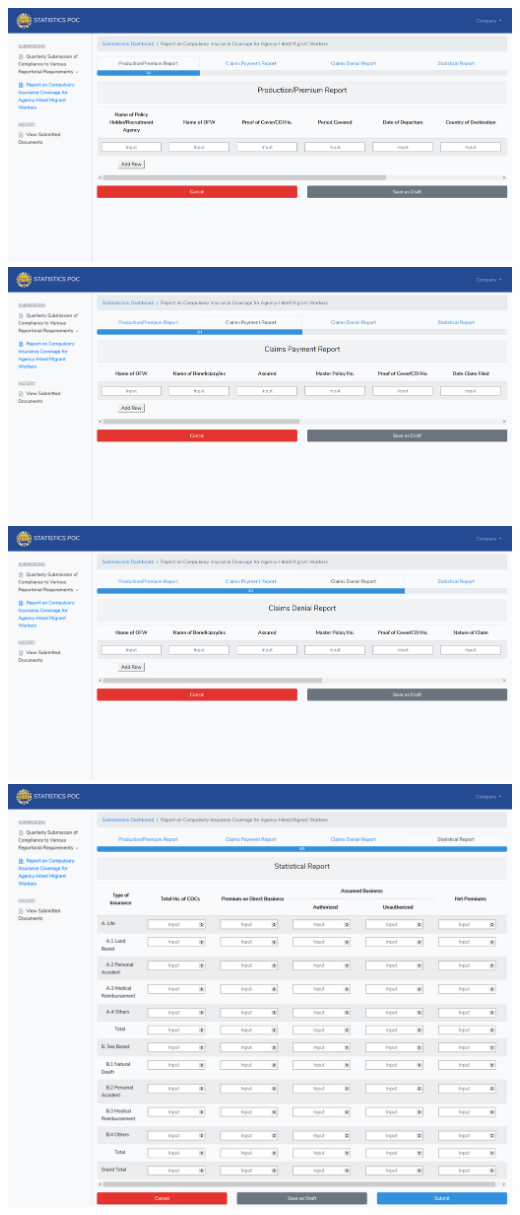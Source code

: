 \documentclass{article}
\begin{document}
\includegraphics[keepaspectratio=true]{up-ic-screens/image100}{}\includegraphics[keepaspectratio=true]{up-ic-screens/image152}{}\includegraphics[keepaspectratio=true]{up-ic-screens/image145}{}\includegraphics[keepaspectratio=true]{up-ic-screens/image188}{}%
\end{document}
